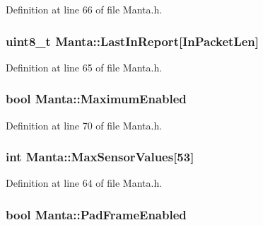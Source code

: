 \-Definition at line 66 of file \-Manta.\-h.

\hypertarget{classManta_a85dabdaeb8266210f46aa7b0e6a9b484}{
\subsubsection[{\-Last\-In\-Report}]{\setlength{\rightskip}{0pt plus 5cm}uint8\-\_\-t {\bf \-Manta\-::\-Last\-In\-Report}\mbox{[}{\bf \-In\-Packet\-Len}\mbox{]}}}\label{classManta_a85dabdaeb8266210f46aa7b0e6a9b484}


\-Definition at line 65 of file \-Manta.\-h.

\hypertarget{classManta_ae0f462eb61007d202aaf12035a07117d}{
\subsubsection[{\-Maximum\-Enabled}]{\setlength{\rightskip}{0pt plus 5cm}bool {\bf \-Manta\-::\-Maximum\-Enabled}}}\label{classManta_ae0f462eb61007d202aaf12035a07117d}


\-Definition at line 70 of file \-Manta.\-h.

\hypertarget{classManta_aaec4ef50d24285ace0deda24d941185d}{
\subsubsection[{\-Max\-Sensor\-Values}]{\setlength{\rightskip}{0pt plus 5cm}int {\bf \-Manta\-::\-Max\-Sensor\-Values}\mbox{[}53\mbox{]}}}\label{classManta_aaec4ef50d24285ace0deda24d941185d}


\-Definition at line 64 of file \-Manta.\-h.

\hypertarget{classManta_a1830d160b3a333fdc922757b6632bf09}{
\subsubsection[{\-Pad\-Frame\-Enabled}]{\setlength{\rightskip}{0pt plus 5cm}bool {\bf \-Manta\-::\-Pad\-Frame\-Enabled}}}\label{classManta_a1830d160b3a333fdc922757b6632bf09}


